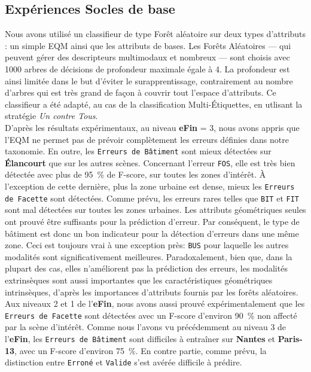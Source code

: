     \subsection*{Expériences Socles de base}
        Nous avons utilisé un classifieur de type Forêt aléatoire sur deux types d'attributs : un simple EQM ainsi que les attributs de bases.
        Les Forêts Aléatoires --- qui peuvent gérer des descripteurs multimodaux et nombreux --- sont choisis avec \num[locale=FR]{1000} arbres de décisions de profondeur maximale égale à \num[locale=FR]{4}.
        La profondeur est ainsi limitée dans le but d'éviter le surapprentissage, contrairement au nombre d'arbres qui est très grand de façon à couvrir tout l'espace d'attributs.
        Ce classifieur a été adapté, au cas de la classification Multi-\'Etiquettes, en utlisant la stratégie \textit{Un contre Tous}.\\

        D'après les résultats expérimentaux, au niveau \textbf{eFin} = 3, nous avons appris que l'EQM ne permet pas de prévoir complètement les erreurs définies dans notre taxonomie.
        En outre, les \texttt{Erreurs de Bâtiment} sont mieux détectées sur \textbf{\'Elancourt} que sur les autres scènes.
        Concernant l'erreur \texttt{FOS}, elle est très bien détectée avec plus de \SI[locale=FR]{95}{\percent} de F-score, sur toutes les zones d'intérêt.
        \`A l'exception de cette dernière, plus la zone urbaine est dense, mieux les \texttt{Erreurs de Facette} sont détectées.
        Comme prévu, les erreurs rares telles que \texttt{BIT} et \texttt{FIT} sont mal détectées sur toutes les zones urbaines.
        Les attributs géométriques seules ont prouvé être suffisants pour la prédiction d'erreur.
        Par conséquent, le type de bâtiment est donc un bon indicateur pour la détection d'erreurs dans une même zone.
        Ceci est toujours vrai à une exception près: \texttt{BUS} pour laquelle les autres modalités sont significativement meilleures.
        Paradoxalement, bien que, dans la plupart des cas, elles n'améliorent pas la prédiction des erreurs, les modalités extrinsèques sont aussi importantes que les caractéristiques géométriques intrinsèques, d'après les importances d'attributs fournis par les forêts aléatoires.\\

        Aux niveaux 2 et 1 de l'\textbf{eFin}, nous avons aussi prouvé expérimentalement que les \texttt{Erreurs de Facette} sont détectées avec un F-score d'environ \SI[locale=FR]{90}{\percent} non affecté par la scène d'intérêt.
        Comme nous l'avons vu précédemment au niveau 3 de l'\textbf{eFin}, les \texttt{Erreurs de Bâtiment} sont difficiles à entraîner sur \textbf{Nantes} et \textbf{Paris-13}, avec un F-score d'environ \SI[locale=FR]{75}{\percent}.
        En contre partie, comme prévu, la distinction entre \texttt{Erroné} et \texttt{Valide} s'est avérée difficile à prédire.

